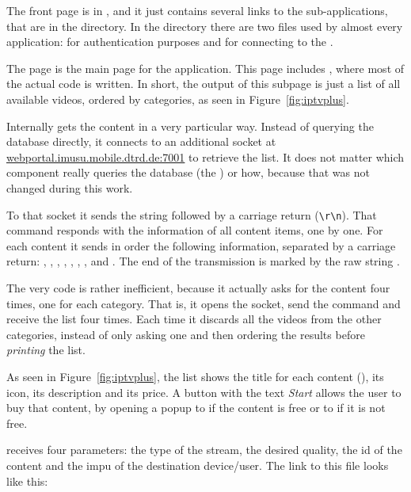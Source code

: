 The front page is in , and it just contains several links to the sub-applications, that are in the  directory.
In the  directory there are two files used by almost every application:  for authentication purposes and  for connecting to the .

The  page is the main page for the  application.
This page includes , where most of the actual code is written.
In short, the output of this subpage is just a list of all available videos, ordered by categories, as seen in Figure~\vref{fig:iptvplus}.

Internally  gets the content in a very particular way.
Instead of querying the database directly, it connects to an additional socket at \url{webportal.imusu.mobile.dtrd.de:7001} to retrieve the list.
It does not matter which component really queries the database (the ) or how, because that was not changed during this work.

To that socket it sends the string  followed by a carriage return (\texttt{\textbackslash{}r\textbackslash{}n}).
That command responds with the information of all content items, one by one.
For each content it sends in order the following information, separated by a carriage return: , , , , , , ,  and .
The end of the transmission is marked by the raw string .

The very  code is rather inefficient, because it actually asks for the content four times, one for each category.
That is, it opens the socket, send the command and receive the list four times.
Each time it discards all the videos from the other categories, instead of only asking one and then ordering the results before \emph{printing} the list.

As seen in Figure~\vref{fig:iptvplus}, the list shows the title for each content (), its icon, its description and its price.
A button with the text \emph{Start} allows the user to buy that content, by opening a popup to  if the content is free or to  if it is not free.

 receives four  parameters: the type of the stream, the desired quality, the id of the content and the impu of the destination device/user.
The link to this  file looks like this:


